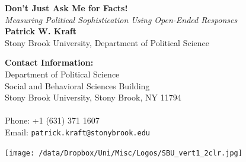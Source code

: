 \documentclass[a0,landscape]{a0poster}
\begin{document}


\begin{minipage}[b]{0.55\linewidth}
\veryHuge \color{NavyBlue} \textbf{Don't Just Ask Me for Facts!} \color{Black}\\ %
\Huge\textit{Measuring Political Sophistication Using Open-Ended Responses}\\[1cm] %
\huge \textbf{Patrick W. Kraft}\\ %
\huge Stony Brook University, Department of Political Science\\ %
\end{minipage}
%
\begin{minipage}[b]{0.25\linewidth}
\color{DarkSlateGray}\Large \textbf{Contact Information:}\\
Department of Political Science\\ %
Social and Behavioral Sciences Building\\
Stony Brook University, Stony Brook, NY 11794\\\\
Phone: +1 (631) 371 1607\\ %
Email: \texttt{patrick.kraft@stonybrook.edu}\\ %
\end{minipage}
%
\begin{minipage}[b]{0.19\linewidth}
\hspace{5cm}\texttt{[image: /data/Dropbox/Uni/Misc/Logos/SBU\_vert1\_2clr.jpg]}\\\\
\end{minipage}

\vspace{1cm} %

\end{document}
